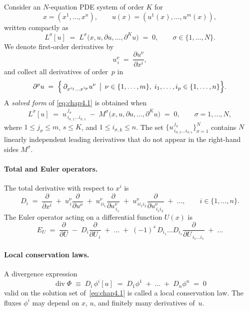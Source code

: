 \documentclass[alpha-refs, 12pt]{wiley-article}
\renewcommand{\leq}{\leqslant}
\newcommand{\pd}[2]{\frac{\partial #1}{\partial #2}}
\begin{document}
Consider an $N$-equation PDE system of order $K$ for
\[
  x=(x^{1},\dots,x^{n}),\qquad
  u(x)=(u^{1}(x),\dots,u^{m}(x)),
\]
written compactly as
\begin{equation}\label{eq:chap4.1}
  L^{\sigma}[u]\;=\;L^{\sigma}\bigl(x,u,\partial u,\dots,\partial^{K}u\bigr)\;=\;0,
  \qquad \sigma \in \{1,\dots,N\}.
\end{equation}
We denote first-order derivatives by
\[
  u^{\nu}_{\,i}\;=\;\pd{u^{\nu}}{x^{i}}, 
\]
and collect all derivatives of order~$p$ in
\begin{equation}\label{eq:chap4.7}
  \partial^{p}u\;=\;
  \Bigl\{\,
      \partial_{x^{i_{1}}\dots x^{i_{p}}} u^{\nu} \,\bigm|\,
      \nu \in \{1,\dots,m\},\;
      i_{1},\dots,i_{p} \in \{1,\dots,n\}
  \Bigr\}.
\end{equation}
A \emph{solved form} of \eqref{eq:chap4.1} is obtained when
\begin{equation}\label{eq:chap4.5}
  L^{\sigma}[u]\;=\;
  u^{\,j_{\sigma}}_{\,i_{\sigma,1}\dots i_{\sigma,s}}
  \;-\;
  M^{\sigma}\bigl(x,u,\partial u,\dots,\partial^{K}u\bigr)
  \;=\;0,
  \qquad
  \sigma=1,\dots,N,
\end{equation}
where $1\leq j_{\sigma}\leq m$, $s\leq K$, and $1\leq i_{\sigma,k}\leq n$. The set $\{u^{\,j_{\sigma}}_{\,i_{\sigma,1}\dots i_{\sigma,s}}\}_{\sigma=1}^{N}$ contains $N$ linearly independent leading derivatives that do not appear in the right-hand sides $M^{\sigma}$.

\paragraph{Total and Euler operators.} The total derivative with respect to $x^{i}$ is
\[
  D_{i}\;=\;
  \pd{}{x^{i}}
  \;+\;
  u^{\nu}_{\,i}\pd{}{u^{\nu}}
  \;+\;
  u^{\nu}_{\,ii_{1}}\pd{}{u^{\nu}_{\,i_{1}}}
  \;+\;
  u^{\nu}_{\,ii_{1}i_{2}}\pd{}{u^{\nu}_{\,i_{1}i_{2}}}
  \;+\;\dots,
  \qquad i \in \{1,\dots,n\}.
\]
The Euler operator acting on a differential function $U(x)$ is
\begin{equation}\label{eq:chap4.4}
  E_{U}\;=\;
  \pd{}{U}
  \;-\;
  D_{i}\pd{}{U_{\,i}}
  \;+\;
  \dots
  \;+\;
  (-1)^{s}\,D_{i_{1}}\dots D_{i_{s}}
  \pd{}{U_{\,i_{1}\dots i_{s}}}
  \;+\;\dots
\end{equation}

\paragraph{Local conservation laws.} A divergence expression
\begin{equation}\label{eq:chap4.2}
  \operatorname{div}\Phi
  \;\equiv\;
  D_{i}\,\phi^{i}[u]
  \;=\;
  D_{1}\phi^{1}
  \;+\;\dots\;+\;
  D_{n}\phi^{n}
  \;=\;0
\end{equation}
valid on the solution set of~\eqref{eq:chap4.1} is called a local conservation law. The fluxes $\phi^{i}$ may depend on $x$, $u$, and finitely many derivatives of~$u$.
\end{document}
